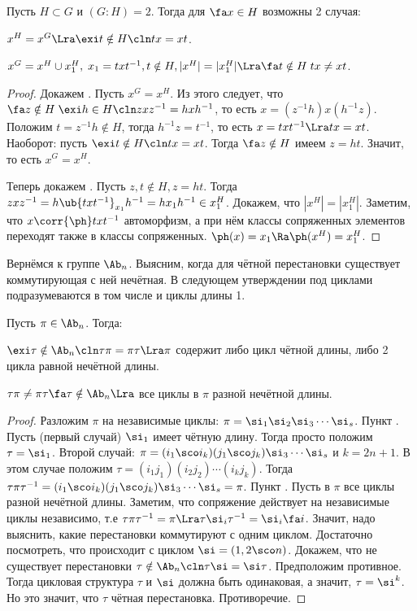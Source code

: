\documentclass[a4paper]{article}
\begin{document}
\begin{stm}
Пусть $H \subset G$ и $(G:H)=2$. Тогда для $\fa x \in H$ возможны 2 случая:

 $x^H=x^G \Lra \exi t \notin H\cln tx=xt$.

 $x^G=x^H \cup x_1^H, \; x_1=txt^{-1}, t \notin H, |x^H|=|x_1^H| \Lra \fa t \notin H \; tx \neq xt$.
\end{stm}

\begin{proof}
Докажем . Пусть $x^G=x^H$. Из этого следует, что $\fa z \notin H \; \exi h \in H\cln zxz^{-1}=hxh^{-1}$,
то есть $x=(z^{-1}h)x(h^{-1}z)$. Положим $t=z^{-1}h \notin H$, тогда $h^{-1}z = t^{-1}$, то есть $x=txt^{-1} \Lra
tx=xt$. Наоборот: пусть $\exi t \notin H\cln tx=xt$. Тогда $\fa z \notin H$ имеем $z=ht$. Значит,
то есть $x^G=x^H$.

Теперь докажем . Пусть $z,t \notin H, z=ht$. Тогда $zxz^{-1}= h\ub{txt^{-1}}_{x_1}h^{-1} =hx_1h^{-1}
\in x_1^H$. Докажем, что $|x^H|=|x_1^H|$.  Заметим, что $x \corr{\ph} txt^{-1}$ автоморфизм, а при нём
классы сопряженных элементов переходят также в классы сопряженных. $\ph(x) = x_1 \Ra \ph(x^H)= x_1^H$.
\end{proof}

Вернёмся к группе $\Ab_n$. Выясним, когда для чётной перестановки существует коммутирующая с ней нечётная.
В следующем утверждении под циклами подразумеваются в том числе и циклы длины 1.

\begin{stm}Пусть $\pi \in \Ab_n$. Тогда:

 $\exi \tau \notin \Ab_n\cln \tau\pi = \pi\tau \Lra \pi$ содержит либо цикл чётной длины, либо 2  цикла
равной нечётной длины.

 $\tau\pi \neq \pi\tau \fa \tau \notin \Ab_n \Lra$ все циклы в $\pi$ разной нечётной длины.
\end{stm}

\begin{proof}
Разложим $\pi$ на независимые циклы: $\pi=\si_1\si_2\si_3\cdots\si_s$. Пункт . Пусть
(первый случай) $\si_1$ имеет чётную длину. Тогда просто положим $\tau = \si_1$. Второй случай: $\pi =
(i_1 \sco i_k)(j_1 \sco j_k)\si_3\cdots\si_s$ и $k=2n+1$. В этом случае положим $\tau = (i_1 j_1)(i_2
j_2)\cdots (i_k j_k)$. Тогда $\tau \pi \tau^{-1} = (i_1 \sco i_k)(j_1 \sco j_k)\si_3\cdots\si_s = \pi$.
Пункт . Пусть в $\pi$ все циклы разной нечётной длины. Заметим, что сопряжение действует на независимые
циклы независимо, т.е $\tau\pi\tau^{-1} = \pi \Lra \tau \si_i \tau^{-1} = \si_i \fa i$. Значит, надо
выяснить, какие перестановки коммутируют с одним циклом. Достаточно посмотреть, что происходит с циклом
$\si=(1,2 \sco n)$. Докажем, что не существует перестановки $\tau \notin \Ab_n\cln \tau\si=\si\tau$.
Предположим противное. Тогда цикловая структура $\tau$ и $\si$ должна быть одинаковая, а значит, $\tau =
\si^k$. Но это значит, что $\tau$ чётная перестановка. Противоречие.
\end{proof}
\end{document}
